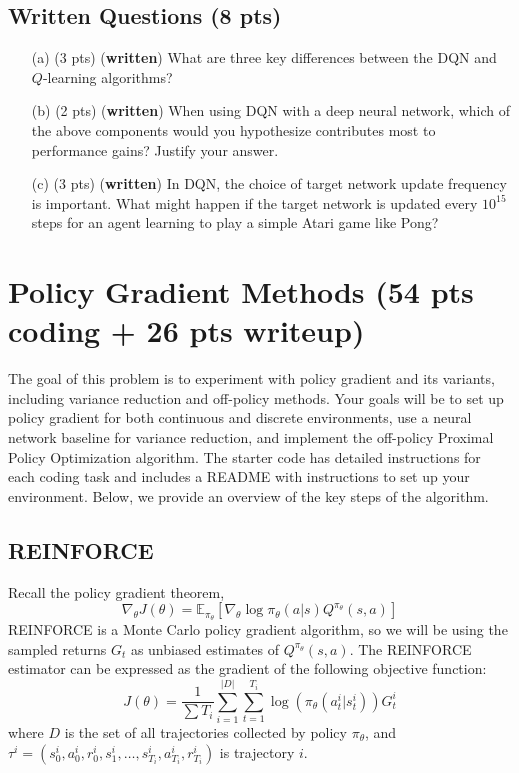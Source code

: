 \documentclass{article}
\begin{document}
\subsection{Written Questions (8 pts)}

\begin{enumerate}
    \item[(a) (3 pts)] (\textbf{written}) What are three key differences between the DQN and $Q$-learning algorithms?

    \item[(b) (2 pts)] (\textbf{written}) When using DQN with a deep neural network, which of the above components would you hypothesize contributes most to performance gains? Justify your answer.

    \item[(c) (3 pts)] (\textbf{written}) In DQN, the choice of target network update frequency is important. What might happen if the target network is updated every $10^{15}$ steps for an agent learning to play a simple Atari game like Pong?
\end{enumerate}

\newpage
\section{Policy Gradient Methods (54 pts coding + 26 pts writeup)}
The goal of this problem is to experiment with policy gradient and its variants, including variance reduction and off-policy methods. Your goals will be to set up policy gradient for both continuous and discrete environments, use a neural network baseline for variance reduction, and implement the off-policy Proximal Policy Optimization algorithm. The starter code has detailed instructions for each coding task and includes a README with instructions to set up your environment. Below, we provide an overview of the key steps of the algorithm.

\subsection{REINFORCE}
Recall the policy gradient theorem,
\[ \nabla_\theta J(\theta) = \mathbb E_{\pi_\theta} \left[ \nabla_\theta \log\pi_\theta(a|s) Q^{\pi_\theta} (s,a) \right] \]
REINFORCE is a Monte Carlo policy gradient algorithm, so we will be using the sampled returns $G_t$ as unbiased estimates of $Q^{\pi_\theta}(s,a)$. 
The REINFORCE estimator can be expressed as the gradient of the following objective function:
\[ J(\theta) = \frac{1}{\sum T_i} \sum_{i=1}^{|D|} \sum_{t=1}^{T_i} \log(\pi_\theta(a^i_t|s^i_t)) G^i_t \]
where $D$ is the set of all trajectories collected by policy $\pi_\theta$, and $\tau^i =(s^i_0, a^i_0, r^i_0, s^i_1, \dots, s^i_{T_i}, a^i_{T_i}, r^i_{T_i})$ is trajectory $i$.
\end{document}
